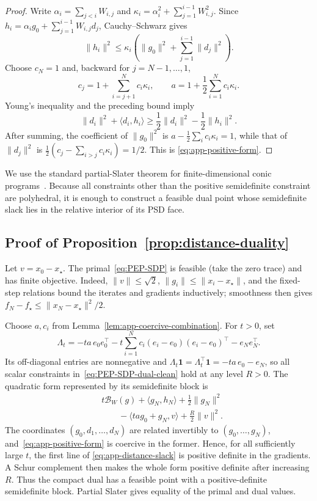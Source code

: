 \documentclass[11pt]{article}
\begin{document}
\begin{proof}
Write $\alpha_i=\sum_{j<i}W_{i,j}$ and
$\kappa_i=\alpha_i^2+\sum_{j=1}^{i-1}W_{i,j}^2$. Since
$h_i=\alpha_i g_0+\sum_{j=1}^{i-1}W_{i,j}d_j$, Cauchy--Schwarz gives
\[
 \|h_i\|^2\le
 \kappa_i\left(\|g_0\|^2+
 \sum_{j=1}^{i-1}\|d_j\|^2\right).
\]
Choose $c_N=1$ and, backward for $j=N-1,\ldots,1$,
\[
 c_j=1+\sum_{i=j+1}^Nc_i\kappa_i,
 \qquad
 a=1+\frac12\sum_{i=1}^Nc_i\kappa_i.
\]
Young's inequality and the preceding bound imply
\[
 \|d_i\|^2+\langle d_i,h_i\rangle
 \ge\frac12\|d_i\|^2-\frac12\|h_i\|^2.
\]
After summing, the coefficient of $\|g_0\|^2$ is
$a-\frac12\sum_i c_i\kappa_i=1$, while that of $\|d_j\|^2$ is
$\frac12(c_j-\sum_{i>j}c_i\kappa_i)=1/2$. This is
\eqref{eq:app-positive-form}.
\end{proof}

We use the standard partial-Slater theorem for finite-dimensional conic
programs~\cite[Theorem~28.2]{rockafellar1970}. Because all constraints other
than the positive semidefinite constraint are polyhedral, it is enough to
construct a feasible dual point whose semidefinite slack lies in the relative
interior of its PSD face.

\subsection{Proof of Proposition~\ref{prop:distance-duality}}
\label{app:distance-duality}
Let $v=x_0-x_\star$. The primal~\eqref{eq:PEP-SDP} is feasible
(take the zero trace) and has finite objective. Indeed,
$\|v\|\leq\sqrt2$, $\|g_i\|\leq\|x_i-x_\star\|$, and the fixed-step relations
bound the iterates and gradients inductively; smoothness then gives
$f_N-f_\star\leq\|x_N-x_\star\|^2/2$.

Choose $a,c_i$ from Lemma~\ref{lem:app-coercive-combination}. For $t>0$, set
\[
\Lambda_t
=-ta\,e_0e_0^\top
-t\sum_{i=1}^Nc_i(e_i-e_0)(e_i-e_0)^\top
-e_Ne_N^\top.
\]
Its off-diagonal entries are nonnegative and $\Lambda_t\mathbf1
    =\Lambda_t^\top\mathbf1
    =-ta\,e_0-e_N$,
so all scalar constraints in~\eqref{eq:PEP-SDP-dual-clean} hold at any level
$R>0$. The quadratic form represented by its semidefinite block is
\begin{equation}\label{eq:app-distance-slack}
\begin{aligned}
&t\mathcal B_W(g)+\langle g_N,h_N\rangle
+\frac12\|g_N\|^2\\
&\qquad
-\langle ta g_0+g_N,v\rangle
+\frac R2\|v\|^2.
\end{aligned}
\end{equation}
The coordinates $(g_0,d_1,\ldots,d_N)$ are related invertibly to
$(g_0,\ldots,g_N)$, and~\eqref{eq:app-positive-form} is coercive in the
former. Hence, for all sufficiently large $t$, the first line of
\eqref{eq:app-distance-slack} is positive definite in the gradients. A Schur
complement then makes the whole form positive definite after increasing $R$.
Thus the compact dual has a feasible point with a positive-definite
semidefinite block. Partial Slater gives equality of the primal and dual
values.
\end{document}
